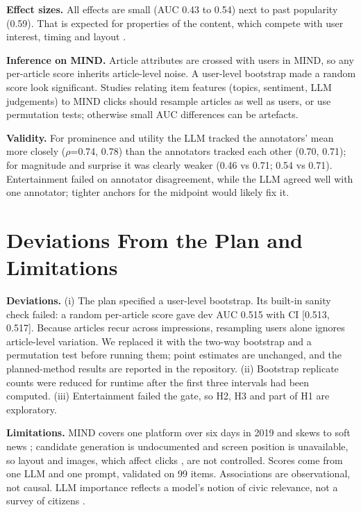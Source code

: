 \textbf{Effect sizes.} All effects are small (AUC 0.43 to 0.54) next to past popularity (0.59). That is expected for properties of the content, which compete with user interest, timing and layout \cite{xun2021}.

\textbf{Inference on MIND.} Article attributes are crossed with users in MIND, so any per-article score inherits article-level noise. A user-level bootstrap made a random score look significant. Studies relating item features (topics, sentiment, LLM judgements) to MIND clicks should resample articles as well as users, or use permutation tests; otherwise small AUC differences can be artefacts.

\textbf{Validity.} For prominence and utility the LLM tracked the annotators' mean more closely ($\rho$=0.74, 0.78) than the annotators tracked each other (0.70, 0.71); for magnitude and surprise it was clearly weaker (0.46 vs 0.71; 0.54 vs 0.71). Entertainment failed on annotator disagreement, while the LLM agreed well with one annotator; tighter anchors for the midpoint would likely fix it.

\section{Deviations From the Plan and Limitations}\label{sec:deviations}
\textbf{Deviations.} (i) The plan specified a user-level bootstrap. Its built-in sanity check failed: a random per-article score gave dev AUC 0.515 with CI [0.513, 0.517]. Because articles recur across impressions, resampling users alone ignores article-level variation. We replaced it with the two-way bootstrap and a permutation test before running them; point estimates are unchanged, and the planned-method results are reported in the repository. (ii) Bootstrap replicate counts were reduced for runtime after the first three intervals had been computed. (iii) Entertainment failed the gate, so H2, H3 and part of H1 are exploratory.

\textbf{Limitations.} MIND covers one platform over six days in 2019 and skews to soft news \cite{vrijenhoek2023}; candidate generation is undocumented and screen position is unavailable, so layout and images, which affect clicks \cite{xun2021}, are not controlled. Scores come from one LLM and one prompt, validated on 99 items. Associations are observational, not causal. LLM importance reflects a model's notion of civic relevance, not a survey of citizens \cite{meese2025}.


